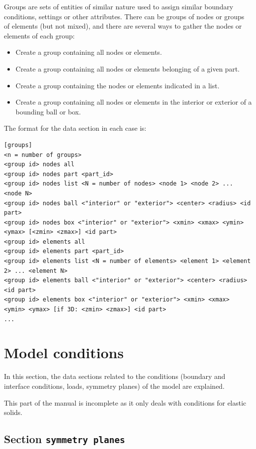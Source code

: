 \documentclass[a4paper,fleqn]{book}
\begin{document}
Groups are sets of entities of similar nature used to assign similar boundary conditions, settings or other attributes. There can be groups of nodes or groups of elements (but not mixed), and there are several ways to gather the nodes or elements of each group:
\begin{itemize}
  \item Create a group containing all nodes or elements.
  \item Create a group containing all nodes or elements belonging of a given part.
  \item Create a group containing the nodes or elements indicated in a list.
  \item Create a group containing all nodes or elements in the interior or exterior of a bounding ball or box.
\end{itemize}
The format for the data section in each case is:
\begin{Verbatim}[frame=single, fontsize=\small, label={general format of section [groups]}]
[groups]
<n = number of groups>
<group id> nodes all 
<group id> nodes part <part_id> 
<group id> nodes list <N = number of nodes> <node 1> <node 2> ... <node N>
<group id> nodes ball <"interior" or "exterior"> <center> <radius> <id part>
<group id> nodes box <"interior" or "exterior"> <xmin> <xmax> <ymin> <ymax> [<zmin> <zmax>] <id part>
<group id> elements all
<group id> elements part <part_id> 
<group id> elements list <N = number of elements> <element 1> <element 2> ... <element N>
<group id> elements ball <"interior" or "exterior"> <center> <radius> <id part>
<group id> elements box <"interior" or "exterior"> <xmin> <xmax> <ymin> <ymax> [if 3D: <zmin> <zmax>] <id part>
...
\end{Verbatim} 

\section{Model conditions}

In this section, the data sections related to the conditions (boundary and interface conditions, loads, symmetry planes) of the model are explained. 

This part of the manual is incomplete as it only deals with conditions for elastic solids.

\subsection{Section \texttt{symmetry planes}}
\label{sec:symmetry_planes}
\end{document}
